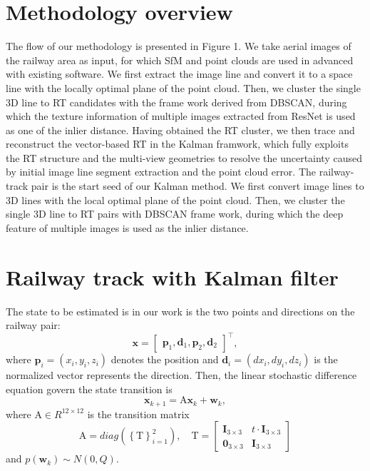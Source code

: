 \section{Methodology overview}

The flow of our methodology is presented in Figure 1.
We take aerial images of the railway area as input,
for which SfM and point clouds are used in advanced with existing software.
We first extract the image line and convert it to a space line with the locally optimal plane of the point cloud.
Then,
we cluster the single 3D line to RT candidates with the frame work derived from DBSCAN,  
during which the texture information of multiple images extracted from ResNet is used as one of the inlier distance.
Having obtained the RT cluster, 
we then trace and reconstruct the vector-based RT in the Kalman framwork,
which fully exploits the RT structure and the multi-view geometries to resolve the uncertainty caused by initial image line segment extraction and the point cloud error.
The railway-track pair is the start seed of our Kalman method.
We first convert image lines to 3D lines with the local optimal plane of the point cloud.
Then,
we cluster the single 3D line to RT pairs with DBSCAN frame work,  
during which the deep feature of multiple images is used as the inlier distance.





\section{Railway track with Kalman filter}

The state to be estimated is in our work is the two points and directions on the railway pair:
\begin{equation}
\mathbf{x} = \begin{bmatrix}
    \mathbf p_1,\mathbf d_1,\mathbf p_2,\mathbf d_2 
\end{bmatrix}^ \top,
\end{equation}
where $\mathbf p_i=\left(x_i, y_i, z_i\right)$ denotes the position 
and $\mathbf d_i=\left(dx_i, dy_i, dz_i\right)$ is the normalized vector represents the direction.
Then,
the linear stochastic difference equation govern the state transition is
\begin{equation}
\mathbf x_{k+1} = 
    \mathrm A \mathbf x_{k} + \mathbf w_k,
    \label{eq_statetransition}
\end{equation}
where $\mathrm A \in R ^ {12 \times 12 }$ is the transition matrix
\begin{equation}
\mathrm A=diag \left(\left\{\mathrm T\right\}_{i=1}^2\right),\quad
\mathrm T=
\left[
\begin{smallmatrix}
\mathbf I_{3\times3}  &  t \cdot \mathbf I_{3\times3} \\
\mathbf 0_{3\times3}  &  \mathbf I_{3\times3}
\end{smallmatrix}
\right]
\end{equation}
and $p \left(\mathbf w_k \right) \sim N(0, Q)$.

